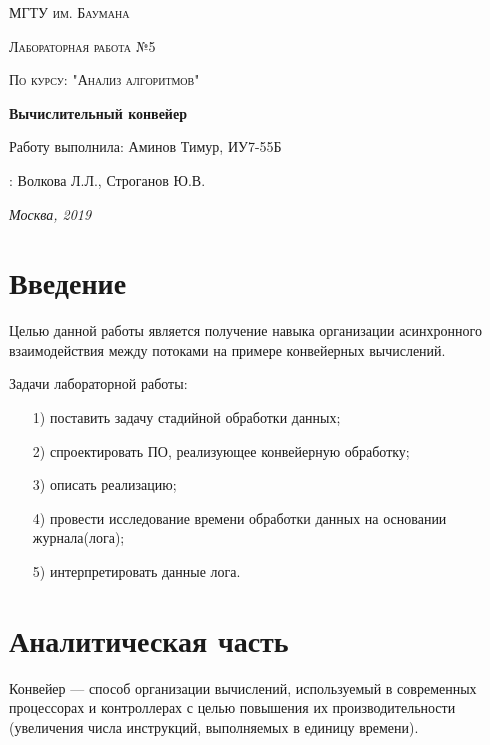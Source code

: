 \documentclass[a4paper,14pt]{report}
\begin{document}
\begin{titlepage}
	\centering
	{\scshape\LARGE МГТУ им. Баумана \par}
	\vspace{3cm}
	{\scshape\Large Лабораторная работа №5\par}
	\vspace{0.5cm}
	{\scshape\Large По курсу: "Анализ алгоритмов"\par}
	\vspace{1.5cm}
	{\huge\bfseries Вычислительный конвейер\par}
	\vspace{2cm}
	\Large Работу выполнила: Аминов Тимур, ИУ7-55Б\par
	\vspace{0.5cm}
	:  Волкова Л.Л., Строганов Ю.В.\par

	\vfill
	\large \textit {Москва, 2019} \par
\end{titlepage}

\tableofcontents

\newpage
\chapter*{Введение}

Целью данной работы является получение навыка организации асинхронного взаимодействия между потоками на примере конвейерных вычислений.

Задачи лабораторной работы:
\begin{enumerate}
	\item[1)] поставить задачу стадийной обработки данных;
	\item[2)] спроектировать ПО, реализующее конвейерную обработку;
	\item[3)] описать реализацию;
  	\item[4)] провести исследование времени обработки данных на основании журнала(лога);
	\item[5)] интерпретировать данные лога.
\end{enumerate}


\chapter*{Аналитическая часть}
Конвейер — способ организации вычислений, используемый в современных процессорах и контроллерах с целью повышения их производительности (увеличения числа инструкций, выполняемых в единицу времени).
\end{document}

